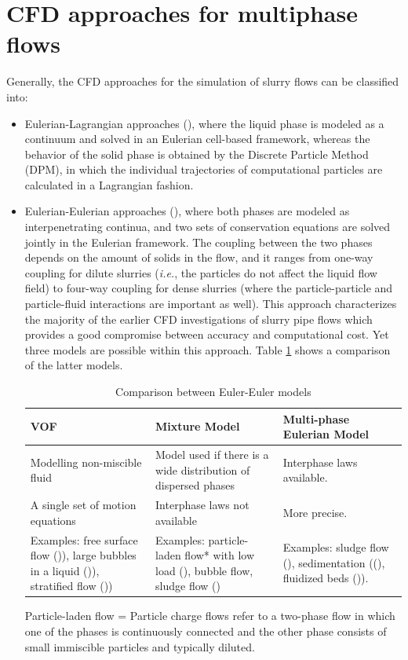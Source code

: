 \documentclass[11pt]{report}
\begin{document}
\section{CFD approaches for multiphase flows}
Generally, the CFD approaches for the simulation of slurry flows can be classified into:
\begin{itemize}
\item Eulerian-Lagrangian approaches (\cite{crowe-2011}), where the liquid phase is modeled as a continuum and solved in an Eulerian cell-based framework, whereas the behavior of the solid phase is obtained by the Discrete Particle Method (DPM), in which the individual trajectories of computational particles are calculated in a Lagrangian fashion.
%
\item Eulerian-Eulerian approaches (\cite{crowe-2011}), where  both phases are modeled as interpenetrating continua, and two sets of conservation equations are solved jointly in the Eulerian framework.
%
The coupling between the two phases depends on the amount of solids in the flow, and it ranges from one-way coupling for dilute slurries (\textit{i.e.}, the particles do not affect the liquid flow field) to four-way coupling for dense slurries (where the particle-particle and particle-fluid interactions are important as well).
%
This approach characterizes the majority of the earlier CFD investigations of slurry pipe flows which provides a good compromise between accuracy and computational cost.
%
Yet three models are possible within this approach.
%
Table \ref{tab:eul-eul-comp} shows a comparison of the latter models.
%
\begin{table}[ht!]
\caption{Comparison between Euler-Euler models}
\begin{tabular}{p{5.2cm}|p{5.2cm}|p{5.2cm}}
\hline 
VOF & 
Mixture Model & 
Multi-phase Eulerian Model 
\\\hline
Modelling non-miscible fluid &
Model used if there is a wide distribution of dispersed phases &
Interphase laws available. 
\\ \hline 
A single set of motion equations & 
Interphase laws not available & 
More precise. 
\\ \hline 
Examples: free surface flow (\cite{Jing-2016})), large bubbles in a liquid (\cite{Al-Yaari-2011})), stratified flow (\cite{Akhtar-2007})) & 
Examples: particle-laden flow* with low load (\cite{J-2007}), bubble flow, sludge flow (\cite{Liangyon-2009})  & 
Examples: sludge flow (\cite{Ofei-2016}), sedimentation ((\cite{gopaliya-2016}), fluidized beds (\cite{Ofei-2014})).\\
\hline
\end{tabular}
\label{tab:eul-eul-comp}
\end{table}
{\footnotesize *Particle-laden flow = Particle charge flows refer to a two-phase flow in which one of the phases is continuously connected and the other phase consists of small immiscible particles and typically diluted.}
\end{itemize}
\end{document}
